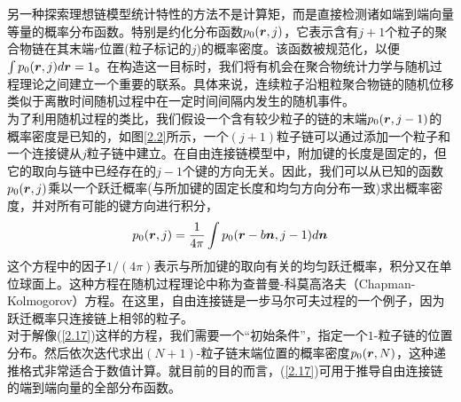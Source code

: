 另一种探索理想链模型统计特性的方法不是计算矩，而是直接检测诸如端到端向量等量的概率分布函数。特别是约化分布函数$p_{0}(\bm{r},j)$，它表示含有$j+1$个粒子的聚合物链在其末端$r$位置(粒子标记的$j$)的概率密度。该函数被规范化，以便$\int p_0(\bm{r},j)d\bm{r}=1$。在构造这一目标时，我们将有机会在聚合物统计力学与随机过程理论之间建立一个重要的联系。具体来说，连续粒子沿粗粒聚合物链的随机位移类似于离散时间随机过程中在一定时间间隔内发生的随机事件。\\

为了利用随机过程的类比，我们假设一个含有较少粒子的链的末端$p_{0}(\bm{r},j-1)$的概率密度是已知的，如图\ref{2.2}所示，一个$(j+1)$粒子链可以通过添加一个粒子和一个连接键从$j$粒子链中建立。在自由连接链模型中，附加键的长度是固定的，但它的取向与链中已经存在的$j−1$个键的方向无关。因此，我们可以从已知的函数$p_{0}(\bm{r},j)$乘以一个跃迁概率(与所加键的固定长度和均匀方向分布一致)求出概率密度，并对所有可能的键方向进行积分，\\
\begin{equation}
p_{0}(\bm{r},j)=\frac{1}{4 \pi} \int p_0(\bm{r}-b \bm{n},j-1)d\bm{n}
\label{2.17}
\end{equation}
这个方程中的因子$1/(4 \pi)$表示与所加键的取向有关的均匀跃迁概率，积分又在单位球面上。这种方程在随机过程理论中称为查普曼-科莫高洛夫（Chapman-Kolmogorov）方程。在这里，自由连接链是一步马尔可夫过程的一个例子，因为跃迁概率只连接链上相邻的粒子。\\

对于解像(\ref{2.17})这样的方程，我们需要一个“初始条件”，指定一个$1$-粒子链的位置分布。然后依次迭代求出$(N+1)$-粒子链末端位置的概率密度$p_{0}(\bm{r},N)$，这种递推格式非常适合于数值计算。就目前的目的而言，(\ref{2.17})可用于推导自由连接链的端到端向量的全部分布函数。\\

